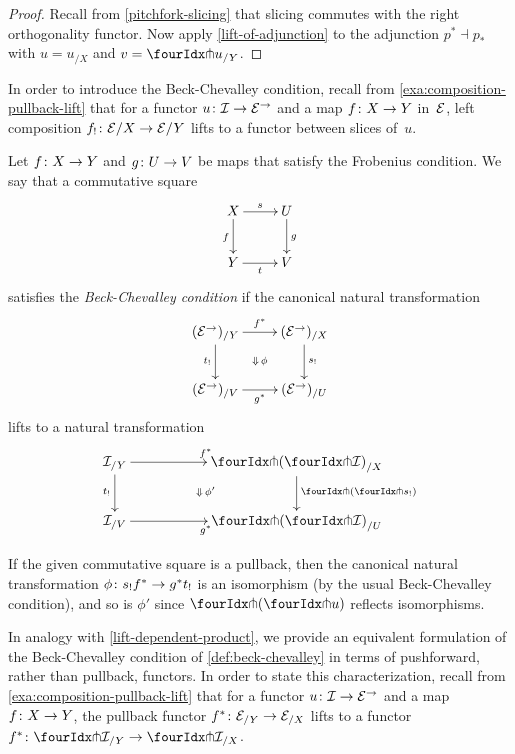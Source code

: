 \documentclass[reqno,10pt,a4paper,oneside,draft]{amsart}
\begin{document}
\begin{proof}
Recall from \cref{pitchfork-slicing} that slicing commutes with the right orthogonality functor.
Now apply \cref{lift-of-adjunction} to the adjunction $p^* \dashv p_*$ with $u = u_{/X}$ and $v = \liftr{u}_{/Y}$.
\end{proof}

In order to introduce the Beck-Chevalley condition, recall from \cref{exa:composition-pullback-lift} that for a functor
 $u \colon \mathcal{I} \to \mathcal{E}^\to$ and a map $f \colon X \to Y$ in~$\mathcal{E}$, 
left composition $f_! \colon \mathcal{E}/X \to \mathcal{E}/Y$ lifts to a functor between slices of~$u$.



\begin{definition} \label{def:beck-chevalley}
Let $f \colon X \to Y$ and $g \colon U \to V$ be maps that satisfy the Frobenius condition.
We say that a commutative square
\[
\xymatrix{
  X
  \ar[d]_{f}
  \ar[r]^{s}
&
  U
  \ar[d]^{g}
\\
  Y
  \ar[r]_{t}
&
  V
}
\]
satisfies the \emph{Beck-Chevalley condition} if the canonical natural transformation
\[
\xymatrix{
  (\cal{E}^\to)_{/Y}
   \ar[d]_{t_!}
  \ar[r]^{f^*} \ar@{}[dr]|{\Downarrow \, \phi}
&
  (\cal{E}^\to)_{/X}
  \ar[d]^{s_!}
\\
  (\cal{E}^\to)_{/V}
  \ar[r]_{g^*}
&
  (\cal{E}^\to)_{/U}
}
\]
lifts to a natural transformation
\[
\xymatrix@C+3em{
   \cal{I}_{/Y}
    \ar[r]^{f^*}
     \ar[d]_{t_!}
    \ar@{}[dr]|{\Downarrow \, \phi'}
   &
  \liftl{(\liftr{\cal{I}})}_{/X}
  \ar[d]^{\liftl{(\liftr{s_!})}} \\
  \cal{I}_{/V}
   \ar[r]_{g^*}
 &
   \liftl{(\liftr{\cal{I}})}_{/U}
}
\]
\end{definition}

\begin{remark}
If the given commutative square is a pullback, then the canonical natural transformation $\phi \colon s_! f^* \to g^* t_!$ is an isomorphism (by the usual Beck-Chevalley condition), and so is $\phi'$ since $\liftl{(\liftr{u})}$ reflects isomorphisms. 
\end{remark}

In analogy with \cref{lift-dependent-product}, we provide an equivalent formulation of the Beck-Chevalley condition of \cref{def:beck-chevalley} in terms of pushforward, rather than pullback, functors.
In order to state this characterization, recall from \cref{exa:composition-pullback-lift} that 
for a functor $u \colon \mathcal{I} \to \mathcal{E}^\to$ and a map $f \colon X \to Y$, the pullback functor $f^* \colon \mathcal{E}_{/Y} \to \mathcal{E}_{/X}$ 
lifts to a functor $f^* \co \liftr{\cal{I}}_{/Y} \to \liftr{\cal{I}}_{/X}$.
\end{document}
